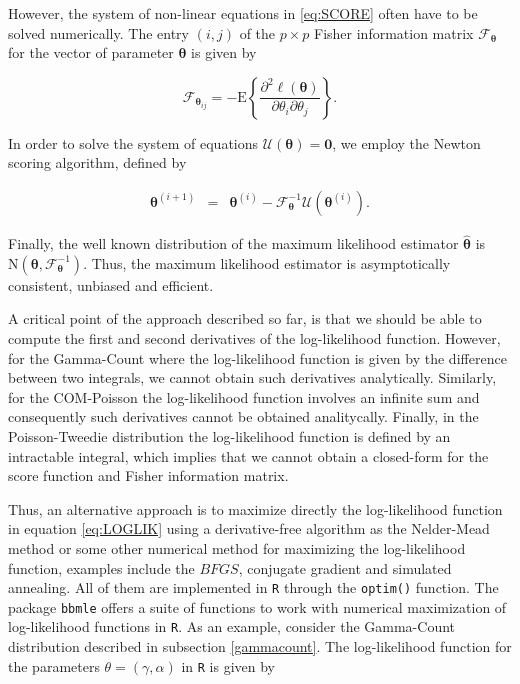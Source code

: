 \documentclass[9pt,a5paper,]{book}
\theoremstyle{definition}
\theoremstyle{definition}
\theoremstyle{remark}
\begin{document}
However, the system of non-linear equations in \eqref{eq:SCORE} often have
to be solved numerically. The entry \((i,j)\) of the \(p \times p\)
Fisher information matrix \(\mathcal{F}_{\boldsymbol{\theta}}\) for the
vector of parameter \(\boldsymbol{\theta}\) is given by

\begin{equation}
\mathcal{F}_{\boldsymbol{\theta}_{ij}} =-\mathrm{E} \left \{ \frac{\partial^2 \ell(\boldsymbol{\theta})}{\partial\theta_i\partial\theta_j} \right \}.
\end{equation}

In order to solve the system of equations
\(\mathcal{U}(\boldsymbol{\theta}) = \boldsymbol{0}\), we employ the
Newton scoring algorithm, defined by

\begin{eqnarray}
\boldsymbol{\theta}^{(i+1)} &=& \boldsymbol{\theta}^{(i)} - \mathcal{F}_{\boldsymbol{\theta}}^{-1} \mathcal{U}(\boldsymbol{\theta}^{(i)}).
\end{eqnarray}

Finally, the well known distribution of the maximum likelihood estimator
\(\boldsymbol{\hat{\theta}}\) is
\(\mathrm{N}(\boldsymbol{\theta}, \mathcal{F}_{\boldsymbol{\theta}}^{-1})\).
Thus, the maximum likelihood estimator is asymptotically consistent,
unbiased and efficient.

A critical point of the approach described so far, is that we should be
able to compute the first and second derivatives of the log-likelihood
function. However, for the Gamma-Count where the log-likelihood function
is given by the difference between two integrals, we cannot obtain such
derivatives analytically. Similarly, for the COM-Poisson the
log-likelihood function involves an infinite sum and consequently such
derivatives cannot be obtained analitycally. Finally, in the
Poisson-Tweedie distribution the log-likelihood function is defined by
an intractable integral, which implies that we cannot obtain a
closed-form for the score function and Fisher information matrix.

Thus, an alternative approach is to maximize directly the log-likelihood
function in equation \eqref{eq:LOGLIK} using a derivative-free algorithm
as the Nelder-Mead method \citep{Nelder:1965} or some other numerical
method for maximizing the log-likelihood function, examples include the
\(BFGS\), conjugate gradient and simulated annealing. All of them are
implemented in \texttt{R} through the \texttt{optim()} function. The
package \texttt{bbmle} \citep{bbmle:2014} offers a suite of functions to
work with numerical maximization of log-likelihood functions in
\texttt{R}. As an example, consider the Gamma-Count distribution
described in subsection \ref{gammacount}. The log-likelihood function
for the parameters \(\theta = (\gamma, \alpha)\) in \texttt{R} is given
by
\end{document}
